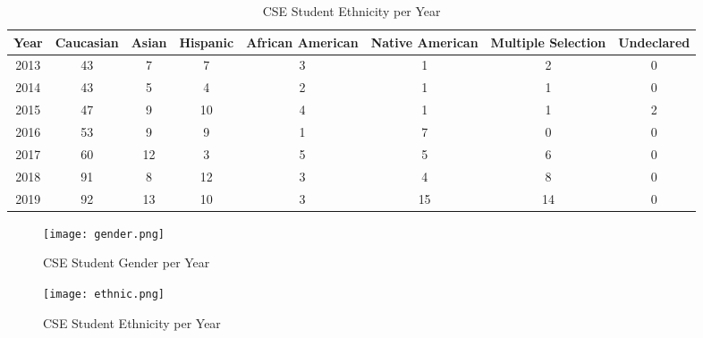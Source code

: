 \documentclass[letterpaper]{article}
\begin{document}
\begin{table}[h]
    \centering
        \begin{tabular}{|c|c|c|c|c|c|c|c|}
            Year & Caucasian & Asian & Hispanic & African American & Native American
            & Multiple Selection & Undeclared\\
            \hline
            2013 & 43 & 7 & 7 & 3 & 1 & 2 & 0\\
            2014 & 43 & 5 & 4 & 2 & 1 & 1 & 0\\
            2015 & 47 & 9 & 10 & 4 & 1 & 1 & 2\\
            2016 & 53 & 9 & 9 & 1 & 7 & 0 & 0\\
            2017 & 60 & 12 & 3 & 5 & 5 & 6 & 0\\
            2018 & 91 & 8 & 12 & 3 & 4 & 8 & 0\\
            2019 & 92 & 13 & 10 & 3 & 15 & 14 & 0\\
        \end{tabular}
    \caption{CSE Student Ethnicity per Year}
    \label{tbl:ethnic}
\end{table}

\begin{figure}[h]
\centering
\texttt{[image: gender.png]}
\caption{CSE Student Gender per Year}
\label{fig:gender}
\end{figure}

\begin{figure}[h]
\centering
\texttt{[image: ethnic.png]}
\caption{CSE Student Ethnicity per Year}
\label{fig:ethnic}
\end{figure}
\end{document}

